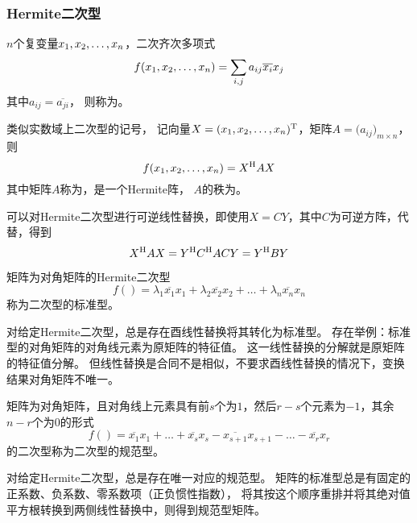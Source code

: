 \subsubsection{Hermite二次型}

\begin{definition}[Hermite二次型]
    $n$个复变量$\VectorComma{x}{n}$，二次齐次多项式
    \[
        f(\VectorComma{x}{n})=\sum_{i,j} a_{ij} \overline{x_i} x_j
    \]
    其中$a_{ij}=\overline{a_{ji}}$，
    则称为。

    类似实数域上二次型的记号，
    记向量$X=(\VectorComma{x}{n})\Transpose$，矩阵$A=\Big(a_{ij}\Big)_{m\times n}$，
    则
    \[
        f(\VectorComma{x}{n}) = X\Hermitian A X
    \]
    其中矩阵$A$称为，是一个Hermite阵，
    $A$的秩为。
\end{definition}

可以对Hermite二次型进行可逆线性替换，即使用$X=CY$，其中$C$为可逆方阵，代替，得到
\[
    X^\mathrm{H} A X = Y^\mathrm{H} C^\mathrm{H} A C Y = Y^\mathrm{H} B Y
\]

\begin{definition}
    矩阵为对角矩阵的Hermite二次型
    \[
        f()=\lambda_1\overline{x_1}x_1+\lambda_2\overline{x_2}x_2+\dots+\lambda_n\overline{x_n}x_n
    \]
    称为二次型的标准型。
\end{definition}

\begin{theorem}
    对给定Hermite二次型，总是存在酉线性替换将其转化为标准型。
    存在举例：标准型的对角矩阵的对角线元素为原矩阵的特征值。
    这一线性替换的分解就是原矩阵的特征值分解。
    但线性替换是合同不是相似，不要求酉线性替换的情况下，变换结果对角矩阵不唯一。
\end{theorem}

\begin{definition}
    矩阵为对角矩阵，且对角线上元素具有前$s$个为$1$，然后$r-s$个元素为$-1$，其余$n-r$个为$0$的形式
    \[
        f()=\overline{x_1}x_1+\dots+\overline{x_s}x_s-\overline{x_{s+1}}x_{s+1}-\dots-\overline{x_r}x_r
    \]
    的二次型称为二次型的规范型。
\end{definition}

\begin{theorem}
    对给定Hermite二次型，总是存在唯一对应的规范型。
    矩阵的标准型总是有固定的正系数、负系数、零系数项（正负惯性指数），
    将其按这个顺序重排并将其绝对值平方根转换到两侧线性替换中，则得到规范型矩阵。
\end{theorem}

